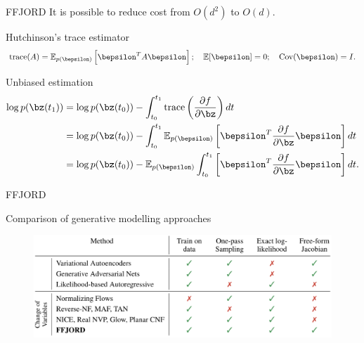 \begin{frame}{FFJORD}
	It is possible to reduce cost from $O(d^2)$ to $O(d)$.
	\begin{block}{Hutchinson's trace estimator}
	\[
	    \text{trace}(A) = \mathbb{E}_{p(\bepsilon)} \left[ \bepsilon^T A \bepsilon \right]; \quad \mathbb{E} [\bepsilon] = 0; \quad \text{Cov} (\bepsilon) = I.
	\]
	\end{block}
	\begin{block}{Unbiased estimation}
		\vspace{-0.3cm}
	\begin{align*}
	    \log p(\bz(t_1)) &= \log p(\bz(t_0)) - \int_{t_0}^{t_1} \text{trace} \left( \frac{\partial f}{\partial \bz} \right) dt \\
	    &= \log p(\bz(t_0)) - \int_{t_0}^{t_1} \mathbb{E}_{p(\bepsilon)} \left[ \bepsilon^T \frac{\partial f}{\partial \bz} \bepsilon \right] dt \\
	    &= \log p(\bz(t_0)) - \mathbb{E}_{p(\bepsilon)} \int_{t_0}^{t_1} \left[ \bepsilon^T \frac{\partial f}{\partial \bz} \bepsilon \right] dt.
	\end{align*}
	\end{block}

\end{frame}
\begin{frame}{FFJORD}
	\begin{block}{Comparison of generative modelling approaches}
		\begin{figure}
		    \centering
		    \includegraphics[width=\linewidth]{figs/flow_comparison.png}
		\end{figure}
	\end{block}
	\vspace{1cm}

\end{frame}
